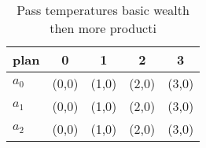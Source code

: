 \documentclass[a4paper]{article}
\begin{document}
\begin{table}
\begin{adjustbox}{width=0.6\columnwidth}
\begin{tabular}{|l|l|l|l|l|}
\hline
\textbf{plan} & \multicolumn{1}{c|}{\textbf{0}} & \multicolumn{1}{c|}{\textbf{1}} & \multicolumn{1}{c|}{\textbf{2}} & \multicolumn{1}{c|}{\textbf{3}} \\ \hline
\textbf{$a_0$}  & (0,0) & (1,0) & (2,0) & (3,0) \\ \hline
\textbf{$a_1$}  & (0,0) & (1,0) & (2,0) & (3,0) \\ \hline
\textbf{$a_2$}  & (0,0) & (1,0) & (2,0) & (3,0) \\ \hline
\end{tabular}
\end{adjustbox}
\caption{Pass temperatures basic wealth then more producti
}
\end{table}
\end{document}
